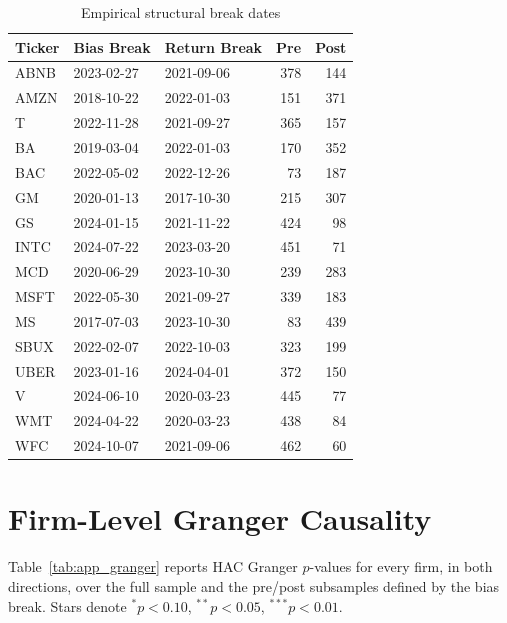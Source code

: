 \documentclass[conference]{IEEEtran}
\begin{document}
\begin{table}[!t]
\caption{Empirical structural break dates}
\label{tab:app_breaks}
\centering
\small
\begin{tabular}{lllrr}
\toprule
Ticker & Bias Break & Return Break & Pre & Post \\
\midrule
ABNB & 2023-02-27 & 2021-09-06 & 378 & 144 \\
AMZN & 2018-10-22 & 2022-01-03 & 151 & 371 \\
T    & 2022-11-28 & 2021-09-27 & 365 & 157 \\
BA   & 2019-03-04 & 2022-01-03 & 170 & 352 \\
BAC  & 2022-05-02 & 2022-12-26 & 73  & 187 \\
GM   & 2020-01-13 & 2017-10-30 & 215 & 307 \\
GS   & 2024-01-15 & 2021-11-22 & 424 & 98  \\
INTC & 2024-07-22 & 2023-03-20 & 451 & 71  \\
MCD  & 2020-06-29 & 2023-10-30 & 239 & 283 \\
MSFT & 2022-05-30 & 2021-09-27 & 339 & 183 \\
MS   & 2017-07-03 & 2023-10-30 & 83  & 439 \\
SBUX & 2022-02-07 & 2022-10-03 & 323 & 199 \\
UBER & 2023-01-16 & 2024-04-01 & 372 & 150 \\
V    & 2024-06-10 & 2020-03-23 & 445 & 77  \\
WMT  & 2024-04-22 & 2020-03-23 & 438 & 84  \\
WFC  & 2024-10-07 & 2021-09-06 & 462 & 60  \\
\bottomrule
\end{tabular}
\end{table}

\section{Firm-Level Granger Causality}
\label{app:granger}
Table~\ref{tab:app_granger} reports HAC Granger $p$-values for every firm, in both
directions, over the full sample and the pre/post subsamples defined by the bias
break. Stars denote $^{*}p<0.10$, $^{**}p<0.05$, $^{***}p<0.01$.
\end{document}
